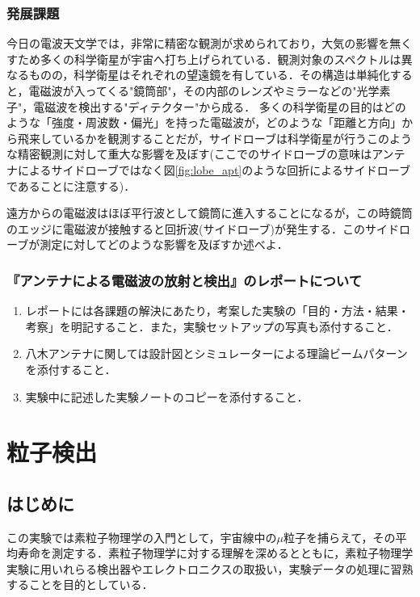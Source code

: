 \documentclass[a4j,10pt,oneside,openany]{jsbook}
\begin{document}
{\subsubsection{発展課題}
今日の電波天文学では，非常に精密な観測が求められており，大気の影響を無くすため多くの科学衛星が宇宙へ打ち上げられている．観測対象のスペクトルは異なるものの，科学衛星はそれぞれの望遠鏡を有している．その構造は単純化すると，電磁波が入ってくる"鏡筒部"，その内部のレンズやミラーなどの"光学素子"，電磁波を検出する"ディテクター"から成る．
多くの科学衛星の目的はどのような「強度・周波数・偏光」を持った電磁波が，どのような「距離と方向」から飛来しているかを観測することだが，サイドローブは科学衛星が行うこのような精密観測に対して重大な影響を及ぼす(ここでのサイドローブの意味はアンテナによるサイドローブではなく図\ref{fig:lobe_apt}のような回折によるサイドローブであることに注意する)．

遠方からの電磁波はほぼ平行波として鏡筒に進入することになるが，この時鏡筒のエッジに電磁波が接触すると回折波(サイドローブ)が発生する．このサイドローブが測定に対してどのような影響を及ぼすか述べよ．

\subsubsection{『アンテナによる電磁波の放射と検出』のレポートについて}
\begin{enumerate}
  \item レポートには各課題の解決にあたり，考案した実験の「目的・方法・結果・考察」を明記すること．また，実験セットアップの写真も添付すること．
  \item 八木アンテナに関しては設計図とシミュレーターによる理論ビームパターンを添付すること．
  \item 実験中に記述した実験ノートのコピーを添付すること．
\end{enumerate}



\newpage
%
%
\section{粒子検出}
\subsection{はじめに}

この実験では素粒子物理学の入門として，宇宙線中の$\mu$粒子を捕らえて，その平均寿命を測定する．素粒子物理学に対する理解を深めるとともに，素粒子物理学実験に用いれらる検出器やエレクトロニクスの取扱い，実験データの処理に習熟することを目的としている．

}
\end{document}

